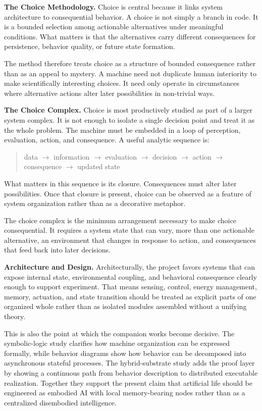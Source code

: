 \documentclass[a4paper,english]{article}
\begin{document}
\textbf{The Choice Methodology.} Choice is central because it links system architecture to consequential
behavior. A choice is not simply a branch in code. It is a bounded
selection among actionable alternatives under meaningful conditions.
What matters is that the alternatives carry different consequences
for persistence, behavior quality, or future state formation.

The method therefore treats choice as a structure of bounded consequence
rather than as an appeal to mystery. A machine need not duplicate
human interiority to make scientifically interesting choices. It need
only operate in circumstances where alternative actions alter later
possibilities in non-trivial ways.

\textbf{The Choice Complex.} Choice is most productively studied as part of a larger system complex.
It is not enough to isolate a single decision point and treat it as
the whole problem. The machine must be embedded in a loop of perception,
evaluation, action, and consequence. A useful analytic sequence is:

\begin{quote}
data $\rightarrow$ information $\rightarrow$ evaluation $\rightarrow$
decision $\rightarrow$ action $\rightarrow$ consequence $\rightarrow$
updated state
\end{quote}

What matters in this sequence is its closure. Consequences must alter
later possibilities. Once that closure is present, choice can be observed
as a feature of system organization rather than as a decorative metaphor.

The choice complex is the minimum arrangement necessary
to make choice consequential. It requires a system state that can
vary, more than one actionable alternative, an environment that changes
in response to action, and consequences that feed back into later
decisions.

\textbf{Architecture and Design.} Architecturally, the project favors systems that can expose internal
state, environmental coupling, and behavioral consequence clearly
enough to support experiment. That means sensing, control, energy
management, memory, actuation, and state transition should be treated
as explicit parts of one organized whole rather than as isolated modules
assembled without a unifying theory.

This is also the point at which the companion works become decisive.
The symbolic-logic study clarifies how machine organization can be
expressed formally, while behavior diagrams show how behavior can
be decomposed into asynchronous stateful processes. The hybrid-substrate
study adds the proof layer by showing a continuous path from behavior
description to distributed executable realization. Together they support
the present claim that artificial life should be engineered as embodied
AI with local memory-bearing nodes rather than as a centralized disembodied
intelligence.
\end{document}
